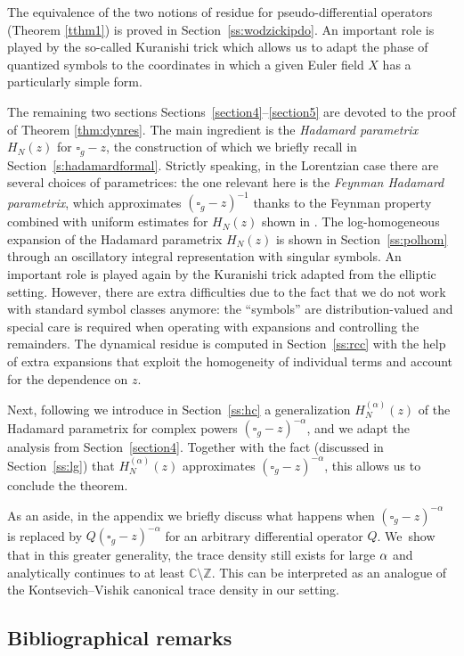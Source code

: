 \documentclass[10pt]{amsart}
\theoremstyle{definition}
\newcommand\zz{{\mathbb Z}}
\newcommand\cc{{\mathbb C}}
\let\cv\alpha
\let\Re\relax
\DeclareMathOperator{\Re}{Re}
\renewcommand{\sec}[1]{Section~\ref{#1}}
\newcommand{\secs}[2]{Sections~\ref{#1}--\ref{#2}}
\begin{document}
The equivalence of the two notions of residue for pseudo-differential operators (Theorem \ref{tthm1}) is proved in \sec{ss:wodzickipdo}. An important role is played by the so-called Kuranishi trick which allows us to adapt the phase of quantized symbols to the coordinates in which a given Euler field $X$ has a particularly simple form.

The remaining two sections \secs{section4}{section5} are devoted to the proof of Theorem \ref{thm:dynres}.
The main ingredient is the \emph{Hadamard parametrix} $H_N(z)$ for $\square_g-z$, the construction of which we briefly recall in \sec{s:hadamardformal}. Strictly speaking, in the Lorentzian case there are several choices of parametrices: the one relevant here is the \emph{Feynman Hadamard parametrix}, which approximates $(\square_g-z)^{-1}$ thanks to the Feynman property combined with uniform estimates for $H_N(z)$ shown in \cite{Dang2020}. The log-homogeneous expansion of the Hadamard parametrix $H_N(z)$ is shown in \sec{ss:polhom} through an oscillatory integral representation with singular symbols. An important role is played again by the Kuranishi trick adapted from the elliptic setting. However, there are extra difficulties due to the fact that we do not work with standard symbol classes anymore: the ``symbols'' are distribution-valued and special care is required when operating with expansions and controlling the remainders. The dynamical residue is computed in \sec{ss:rcc} with the help of extra expansions that exploit the homogeneity of individual terms and account for the dependence on $z$.

Next, following \cite{Dang2020} we introduce in \sec{ss:hc} a generalization $H_N^{(\cv)}(z)$ of the Hadamard parametrix for complex powers $(\square_g-z)^{-\cv}$, and we adapt the analysis from \sec{section4}. Together with the fact (discussed in \sec{ss:lg}) that $H_N^{(\cv)}(z)$ approximates $(\square_g-z)^{-\cv}$, this allows us to conclude the theorem.

As an aside, in the appendix we briefly discuss what happens when $(\square_g-z)^{-\cv}$ is replaced by $Q(\square_g-z)^{-\cv}$ for an arbitrary differential operator $Q$. We~show that in this greater generality, the trace density still exists for large $\Re \cv$ and analytically continues to at least $\cc\setminus \zz$. This can be interpreted as an analogue of the Kontsevich--Vishik canonical trace density \cite{Kontsevich1995} in our setting.

\subsection{Bibliographical remarks}\label{ss:br}
\end{document}
